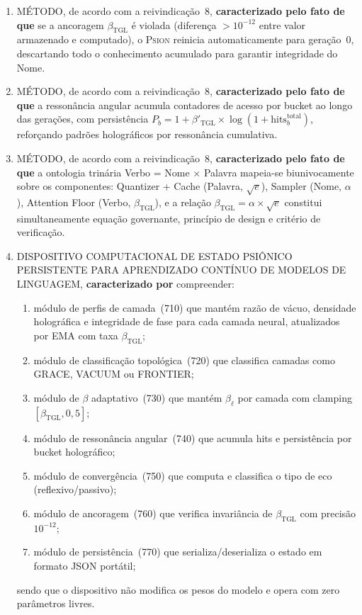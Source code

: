 \documentclass[12pt,a4paper]{article}
\newcommand{\betatgl}{\beta_{\text{TGL}}}
\newcommand{\betared}{\beta'_{\text{TGL}}}
\newcommand{\Psion}{\textsc{Psion}}
\begin{document}
\begin{enumerate}[label=\textbf{\arabic*.}, leftmargin=*, itemsep=0.8em]
\item MÉTODO, de acordo com a reivindicação~8, \textbf{caracterizado pelo fato de que} se a ancoragem $\betatgl$ é violada (diferença $> 10^{-12}$ entre valor armazenado e computado), o \Psion{} reinicia automaticamente para geração~0, descartando todo o conhecimento acumulado para garantir integridade do Nome.

\item MÉTODO, de acordo com a reivindicação~8, \textbf{caracterizado pelo fato de que} a ressonância angular acumula contadores de acesso por bucket ao longo das gerações, com persistência $P_b = 1 + \betared \times \log(1 + \text{hits}_b^{\text{total}})$, reforçando padrões holográficos por ressonância cumulativa.

\item MÉTODO, de acordo com a reivindicação~8, \textbf{caracterizado pelo fato de que} a ontologia trinária Verbo = Nome $\times$ Palavra mapeia-se biunivocamente sobre os componentes: Quantizer + Cache (Palavra, $\sqrt{e}$), Sampler (Nome, $\alpha$), Attention Floor (\linebreak Verbo, $\betatgl$), e a relação $\betatgl = \alpha \times \sqrt{e}$ constitui simultaneamente equação governante, princípio de design e critério de verificação.

\item DISPOSITIVO COMPUTACIONAL DE ESTADO PSIÔNICO PERSISTENTE PARA APRENDIZADO CONTÍNUO DE MODELOS DE LINGUAGEM, \textbf{caracterizado por} compreender:
\begin{enumerate}[label=(\alph*)]
\item módulo de perfis de camada~(710) que mantém razão de vácuo, densidade holográfica e integridade de fase para cada camada neural, atualizados por EMA com taxa $\betatgl$;
\item módulo de classificação topológica~(720) que classifica camadas como GRACE, VACUUM ou FRONTIER;
\item módulo de $\beta$ adaptativo~(730) que mantém $\beta_\ell$ por camada com clamping $[\betatgl, 0{,}5]$;
\item módulo de ressonância angular~(740) que acumula hits e persistência por bucket holográfico;
\item módulo de convergência~(750) que computa e classifica o tipo de eco (reflexivo/passivo);
\item módulo de ancoragem~(760) que verifica invariância de $\betatgl$ com precisão $10^{-12}$;
\item módulo de persistência~(770) que serializa/deserializa o estado em formato JSON portátil;
\end{enumerate}
sendo que o dispositivo não modifica os pesos do modelo e opera com zero parâmetros livres.


\end{enumerate}
\end{document}
